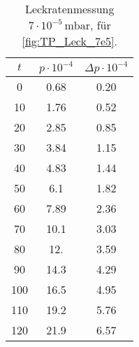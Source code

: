 \begin{table}[H]
    \centering
    \caption{Leckratenmessung $7 \cdot 10^{-5} \, \si{\milli\bar}$, für  \autoref{fig:TP_Leck_7e5}.}
    \label{tab:TP_Leck_7e5}
    \begin{tabular}{c c c}
        \toprule
        {$t$} & {$p \cdot 10^{-4}$} & {$\Delta p \cdot 10^{-4}$} \\
        \midrule
        0  &  0.68 & 0.20\\
        10 &  1.76 & 0.52\\
        20 &  2.85 & 0.85\\
        30 &  3.84 & 1.15\\
        40 &  4.83 & 1.44\\
        50 &  6.1  & 1.82\\
        60 &  7.89 & 2.36\\
        70 &  10.1 & 3.03\\
        80 &  12.  & 3.59\\
        90 &  14.3 & 4.29\\
        100 & 16.5 & 4.95\\
        110 & 19.2 & 5.76\\
        120 & 21.9 & 6.57\\
        \bottomrule
    \end{tabular}
\end{table}

